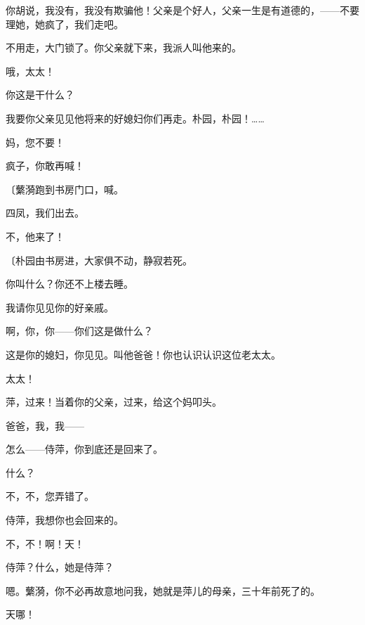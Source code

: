 你胡说，我没有，我没有欺骗他！父亲是个好人，父亲一生是有道德的，——不要理她，她疯了，我们走吧。

不用走，大门锁了。你父亲就下来，我派人叫他来的。

哦，太太！

你这是干什么？

我要你父亲见见他将来的好媳妇你们再走。朴园，朴园！……

妈，您不要！

疯子，你敢再喊！

{\fangsong〔蘩漪跑到书房门口，喊。}

四凤，我们出去。

不，他来了！

{\fangsong〔朴园由书房进，大家俱不动，静寂若死。}

你叫什么？你还不上楼去睡。

我请你见见你的好亲戚。

啊，你，你——你们这是做什么？

这是你的媳妇，你见见。叫他爸爸！你也认识认识这位老太太。

太太！

萍，过来！当着你的父亲，过来，给这个妈叩头。

爸爸，我，我——

怎么——侍萍，你到底还是回来了。

什么？

不，不，您弄错了。

侍萍，我想你也会回来的。

不，不！啊！天！

侍萍？什么，她是侍萍？

嗯。蘩漪，你不必再故意地问我，她就是萍儿的母亲，三十年前死了的。

天哪！

